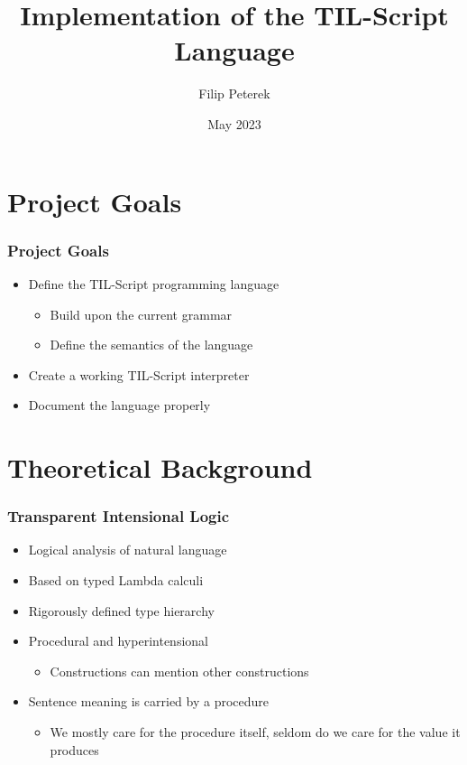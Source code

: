 \documentclass{beamer}
\title{Implementation of the TIL-Script Language}
\author{Filip Peterek}
\institute{VSB -- Technical University of Ostrava}
\date{May 2023}
\begin{document}
\frame{\titlepage}

\section{Project Goals}

\begin{frame}
    \frametitle{Project Goals}
    \begin{itemize}
        \item Define the TIL-Script programming language
            \begin{itemize}
                \item Build upon the current grammar
                \item Define the semantics of the language
            \end{itemize}
        \item Create a working TIL-Script interpreter
        \item Document the language properly
    \end{itemize}
\end{frame}

\section{Theoretical Background}

\begin{frame}
    \frametitle{Transparent Intensional Logic}
    \begin{itemize}
        \item Logical analysis of natural language
        \item Based on typed Lambda calculi
        \item Rigorously defined type hierarchy
        \item Procedural and hyperintensional
            \begin{itemize}
                \item Constructions can mention other constructions
            \end{itemize}
        \item Sentence meaning is carried by a procedure
            \begin{itemize}
                \item We mostly care for the procedure itself, seldom do we care for the value
                it produces
            \end{itemize}
    \end{itemize}
\end{frame}
\end{document}
